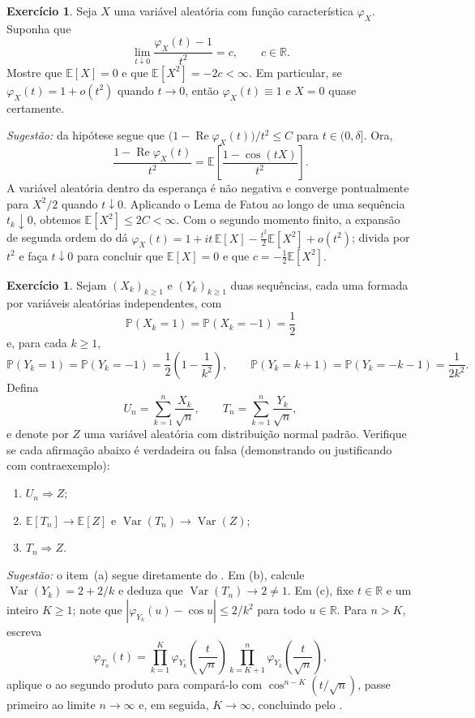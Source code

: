 \documentclass[12pt,portuguese]{article}
\theoremstyle{definition}
\theoremstyle{plainexercise}
\theoremstyle{starredexercise}
\newtheorem{starredexercise}[exercise]{Exercício}
\theoremstyle{definition}
\begin{document}
\begin{starredexercise}\label{exercise:segunda-derivada-nula}
Seja $X$ uma variável aleatória com função característica $\varphi_X$.
Suponha que
\[
  \lim_{t\downarrow0}\frac{\varphi_X(t)-1}{t^2}=c,
  \qquad c\in\mathbb{R}.
\]
Mostre que $\mathbb{E}[X]=0$ e que $\mathbb{E}[X^2]=-2c<\infty$. Em
particular, se $\varphi_X(t)=1+o(t^2)$ quando $t\to0$, então $\varphi_X(t)\equiv1$
e $X=0$ quase certamente.

\noindent\emph{Sugestão:} da hipótese segue que
$\bigl(1-\operatorname{Re}\varphi_X(t)\bigr)/t^2\leqslant C$ para
$t\in(0,\delta]$. Ora,
\[
\frac{1-\operatorname{Re}\varphi_X(t)}{t^2}
=\mathbb{E}\left[\frac{1-\cos(tX)}{t^2}\right].
\]
A variável aleatória dentro da esperança é não negativa e converge
pontualmente para $X^2/2$ quando $t\downarrow0$. Aplicando o Lema de
Fatou ao longo de uma sequência $t_k\downarrow0$, obtemos
$\mathbb{E}[X^2]\leqslant2C<\infty$. Com o segundo momento finito, a expansão
de segunda ordem do  dá
$\varphi_X(t)=1+it\,\mathbb{E}[X]-\frac{t^2}{2}\mathbb{E}[X^2]+o(t^2)$; divida
por $t^2$ e faça $t\downarrow0$ para concluir que $\mathbb{E}[X]=0$ e que
$c=-\frac{1}{2}\mathbb{E}[X^2]$.
\end{starredexercise}

\begin{starredexercise}\label{exercise:gw-8-prob-19}
Sejam $(X_k)_{k\geqslant1}$ e $(Y_k)_{k\geqslant1}$ duas sequências, cada uma
formada por variáveis aleatórias independentes, com
\[
  \mathbb{P}(X_k=1)=\mathbb{P}(X_k=-1)=\frac{1}{2}
\]
e, para cada $k\geqslant1$,
\[
  \mathbb{P}(Y_k=1)=\mathbb{P}(Y_k=-1)
  =\frac{1}{2}\left(1-\frac{1}{k^2}\right),
  \qquad
  \mathbb{P}(Y_k=k+1)=\mathbb{P}(Y_k=-k-1)=\frac{1}{2k^2}.
\]
Defina
\[
  U_n=\sum_{k=1}^n\frac{X_k}{\sqrt{n}},
  \qquad
  T_n=\sum_{k=1}^n\frac{Y_k}{\sqrt{n}},
\]
e denote por $Z$ uma variável aleatória com distribuição normal padrão.
Verifique se cada afirmação abaixo é verdadeira ou falsa (demonstrando ou
justificando com contraexemplo):
\begin{enumerate}[label=(\alph*)]
\item $U_n\Rightarrow Z$;
\item $\mathbb{E}[T_n]\to\mathbb{E}[Z]$ e $\operatorname{Var}(T_n)\to\operatorname{Var}(Z)$;
\item $T_n\Rightarrow Z$.
\end{enumerate}

\noindent\emph{Sugestão:} o item~(a) segue diretamente do . Em (b),
calcule $\operatorname{Var}(Y_k)=2+2/k$ e deduza que $\operatorname{Var}(T_n)\to2\neq1$.
Em (c), fixe $t\in\mathbb{R}$ e um inteiro $K\geqslant1$; note que
$|\varphi_{Y_k}(u)-\cos u|\leqslant 2/k^2$ para todo $u\in\mathbb{R}$. Para
$n>K$, escreva
\[
  \varphi_{T_n}(t)
  =\prod_{k=1}^K\varphi_{Y_k}\!\left(\frac{t}{\sqrt{n}}\right)
   \prod_{k=K+1}^n\varphi_{Y_k}\!\left(\frac{t}{\sqrt{n}}\right),
\]
aplique o  ao segundo produto para compará-lo
com $\cos^{n-K}(t/\sqrt{n})$, passe primeiro ao limite $n\to\infty$ e, em
seguida, $K\to\infty$, concluindo pelo .
\end{starredexercise}
\end{document}
